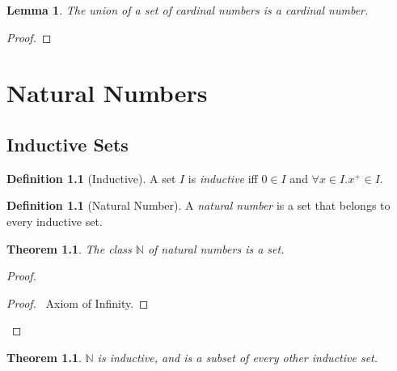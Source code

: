 \documentclass{book}
\let\qed\relax
\newtheorem{thm}[ax]{Theorem}
\newtheorem{lm}[ax]{Lemma}
\theoremstyle{definition}
\newtheorem{df}[ax]{Definition}
\begin{document}
\begin{lm}
\label{lm:supcard}
The union of a set of cardinal numbers is a cardinal number.
\end{lm}

\begin{proof}
\pf
{}
\qed
\end{proof}

\chapter{Natural Numbers}

\section{Inductive Sets}

\begin{df}[Inductive]
A set $I$ is \emph{inductive} iff $0 \in I$ and $\forall x \in I. x^+ \in I$.
\end{df}

\begin{df}[Natural Number]
A \emph{natural number} is a set that belongs to every inductive set.
\end{df}

\begin{thm}
The class $\mathbb{N}$ of natural numbers is a set.
\end{thm}

\begin{proof}
\pf
{}
\begin{proof}
	\pf\ Axiom of Infinity.
\end{proof}
\qed
\end{proof}

\begin{thm}
$\mathbb{N}$ is inductive, and is a subset of every other inductive set.
\end{thm}
\end{document}
